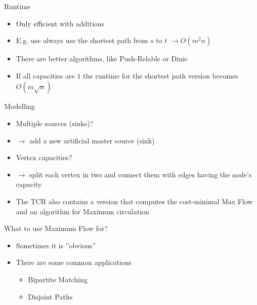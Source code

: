 \documentclass[12pt,t]{beamer}
\newcommand{\bi}{\begin{itemize}}
\newcommand{\ei}{\end{itemize}}
\begin{document}
\begin{frame}{Runtime}
       \bi
	\item Only efficient with additions
	\item E.g. use always use the shortest path from $s$ to $t$ $\rightarrow O(m^2n)$
	\item There are better algorithms, like Push-Relable or Dinic
	\vspace{10pt}
	\item If all capacities are $1$ the runtime for the shortest path version becomes $O(m\sqrt{n})$
       \ei
\end{frame}

\begin{frame}{Modelling}
       \bi
	\item Multiple sources (sinks)?
	\item[$\rightarrow$] add a new artificial master source (sink)
	\vspace{10pt}
	\item Vertex capacities?
	\item[$\rightarrow$] split each vertex in two and connect them with edges having the node's capacity
	\vspace{10pt}
	\item The TCR also contains a version that computes the cost-minimal Max Flow and an algorithm for Maximum circulation
       \ei
\end{frame}

\begin{frame}{What to use Maximum Flow for?}
       \bi
	\item Sometimes it is ''obvious''
	\item There are some common applications
	\bi
	  \item Bipartite Matching
	  \item Disjoint Paths
	\ei
       \ei
\end{frame}
\end{document}
